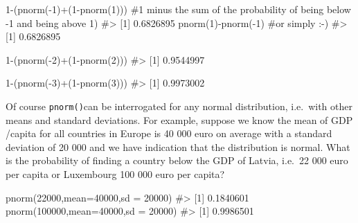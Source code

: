 \documentclass[
  letterpaper,
  DIV=11,
  numbers=noendperiod]{scrreprt}
\newenvironment{Shaded}{\begin{snugshade}}{\end{snugshade}}
\newcommand{\AttributeTok}[1]{\textcolor[rgb]{0.40,0.45,0.13}{#1}}
\newcommand{\CommentTok}[1]{\textcolor[rgb]{0.37,0.37,0.37}{#1}}
\newcommand{\DecValTok}[1]{\textcolor[rgb]{0.68,0.00,0.00}{#1}}
\newcommand{\FunctionTok}[1]{\textcolor[rgb]{0.28,0.35,0.67}{#1}}
\newcommand{\NormalTok}[1]{\textcolor[rgb]{0.00,0.23,0.31}{#1}}
\newcommand{\SpecialCharTok}[1]{\textcolor[rgb]{0.37,0.37,0.37}{#1}}
\begin{document}
\begin{Shaded}
\begin{Highlighting}[]
\DecValTok{1}\SpecialCharTok{{-}}\NormalTok{(}\FunctionTok{pnorm}\NormalTok{(}\SpecialCharTok{{-}}\DecValTok{1}\NormalTok{)}\SpecialCharTok{+}\NormalTok{(}\DecValTok{1}\SpecialCharTok{{-}}\FunctionTok{pnorm}\NormalTok{(}\DecValTok{1}\NormalTok{))) }\CommentTok{\#1 minus the sum of the probability of being below {-}1 and being above 1)}
\CommentTok{\#\textgreater{} [1] 0.6826895}
\FunctionTok{pnorm}\NormalTok{(}\DecValTok{1}\NormalTok{)}\SpecialCharTok{{-}}\FunctionTok{pnorm}\NormalTok{(}\SpecialCharTok{{-}}\DecValTok{1}\NormalTok{) }\CommentTok{\#or simply :{-}) }
\CommentTok{\#\textgreater{} [1] 0.6826895}

\DecValTok{1}\SpecialCharTok{{-}}\NormalTok{(}\FunctionTok{pnorm}\NormalTok{(}\SpecialCharTok{{-}}\DecValTok{2}\NormalTok{)}\SpecialCharTok{+}\NormalTok{(}\DecValTok{1}\SpecialCharTok{{-}}\FunctionTok{pnorm}\NormalTok{(}\DecValTok{2}\NormalTok{))) }
\CommentTok{\#\textgreater{} [1] 0.9544997}

\DecValTok{1}\SpecialCharTok{{-}}\NormalTok{(}\FunctionTok{pnorm}\NormalTok{(}\SpecialCharTok{{-}}\DecValTok{3}\NormalTok{)}\SpecialCharTok{+}\NormalTok{(}\DecValTok{1}\SpecialCharTok{{-}}\FunctionTok{pnorm}\NormalTok{(}\DecValTok{3}\NormalTok{))) }
\CommentTok{\#\textgreater{} [1] 0.9973002}
\end{Highlighting}
\end{Shaded}

Of course \texttt{pnorm()}can be interrogated for any normal
distribution, i.e.~with other means and standard deviations. For
example, suppose we know the mean of GDP /capita for all countries in
Europe is 40 000 euro on average with a standard deviation of 20 000 and
we have indication that the distribution is normal. What is the
probability of finding a country below the GDP of Latvia, i.e.~22 000
euro per capita or Luxembourg 100 000 euro per capita?

\begin{Shaded}
\begin{Highlighting}[]
\FunctionTok{pnorm}\NormalTok{(}\DecValTok{22000}\NormalTok{,}\AttributeTok{mean=}\DecValTok{40000}\NormalTok{,}\AttributeTok{sd =} \DecValTok{20000}\NormalTok{)}
\CommentTok{\#\textgreater{} [1] 0.1840601}
\FunctionTok{pnorm}\NormalTok{(}\DecValTok{100000}\NormalTok{,}\AttributeTok{mean=}\DecValTok{40000}\NormalTok{,}\AttributeTok{sd =} \DecValTok{20000}\NormalTok{)}
\CommentTok{\#\textgreater{} [1] 0.9986501}
\end{Highlighting}
\end{Shaded}
\end{document}
